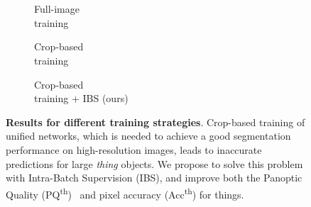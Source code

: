 \documentclass[10pt,twocolumn,letterpaper]{article}
\begin{document}
\begin{figure}[t]
\centering
{} \\
 \\


\begin{subfigure}[b]{0.32\linewidth}

\caption{
Full-image \\ training
\centering}
\end{subfigure}
\begin{subfigure}[b]{0.32\linewidth}
\caption{Crop-based \\ training
\centering}
\end{subfigure}
\begin{subfigure}[b]{0.32\linewidth}
\caption{Crop-based \\ training + IBS (ours)
\centering}
\end{subfigure}
\vspace{-10pt}
\caption{\textbf{Results for different training strategies}. Crop-based training of unified networks, which is needed to achieve a good segmentation performance on high-resolution images, leads to inaccurate predictions for large \textit{thing} objects. We propose to solve this problem with Intra-Batch Supervision (IBS), and improve both the Panoptic Quality (PQ\textsuperscript{th})~\cite{kirillov2019ps} and pixel accuracy (Acc\textsuperscript{th}) for things.}
\vspace{-10pt}
\label{fig:eye_catcher}
\end{figure} 
\end{document}
